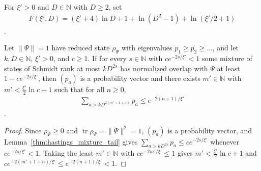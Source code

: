 \begin{definition}
    \label{def:hastings_bootstrap_remainder}
    \leanok
    For $\xi'>0$ and $D\in\mathbb N$ with $D\ge2$, set
    \begin{align}
        F(\xi',D)=(\xi'+4)\ln D+1+\ln(D^2-1)+\ln(\xi'/2+1)
        \label{eq:hastings_bootstrap_remainder}
    \end{align}
    \cite[Lemma~2, lines 304--309]{Hastings2007AreaLaw}.
\end{definition}

\begin{lemma}
    \label{thm:hastings_bootstrap_schmidt_tail}
    \leanok
    Let $\|\Psi\|=1$ have reduced state $\rho_\Psi$ with eigenvalues
    $p_1\ge p_2\ge\dots$, and let $k,D\in\mathbb N$, $\xi'>0$, and $c\ge1$. If
    for every $s\in\mathbb N$ with $ce^{-2s/\xi'}<1$ some mixture of states of
    Schmidt rank at most $kD^{2s}$ has normalized overlap with $\Psi$ at least
    $1-ce^{-2s/\xi'}$, then $(p_a)$ is a probability vector and there exists
    $m'\in\mathbb N$ with $m'<\tfrac{\xi'}{2}\ln c+1$ such that for all
    $n\ge0$,
    \begin{align}
        \sum_{a>kD^{2(m'+1+n)}}p_a\le e^{-2(n+1)/\xi'}
        \label{eq:hastings_bootstrap_schmidt_tail}
    \end{align}
    \cite[Lemma~2, eqs.~(constraint) and (constraint2), lines 333--356]{Hastings2007AreaLaw}.
\end{lemma}
\begin{proof}\leanok
    Since $\rho_\Psi\ge0$ and $\operatorname{tr}\rho_\Psi=\|\Psi\|^2=1$, $(p_a)$
    is a probability vector, and Lemma~\ref{thm:hastings_mixture_tail} gives
    $\sum_{a>kD^{2s}}p_a\le ce^{-2s/\xi'}$ whenever $ce^{-2s/\xi'}<1$. Taking
    the least $m'\in\mathbb N$ with $ce^{-2m'/\xi'}\le1$ gives
    $m'<\tfrac{\xi'}2\ln c+1$ and $ce^{-2(m'+1+n)/\xi'}\le e^{-2(n+1)/\xi'}<1$.
\end{proof}

